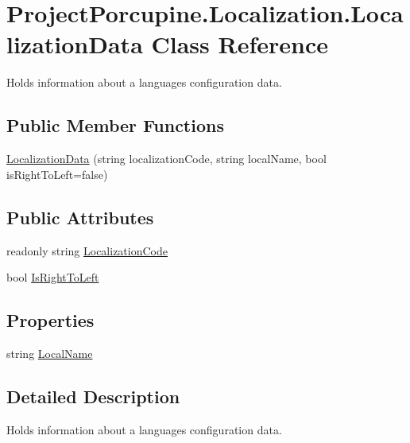 \hypertarget{class_project_porcupine_1_1_localization_1_1_localization_data}{}\section{Project\+Porcupine.\+Localization.\+Localization\+Data Class Reference}
\label{class_project_porcupine_1_1_localization_1_1_localization_data}


Holds information about a language\textquotesingle{}s configuration data.  


\subsection*{Public Member Functions}
\begin{DoxyCompactItemize}
\item 
\hyperlink{class_project_porcupine_1_1_localization_1_1_localization_data_a0d6da83799f72abeb38ae28a867cba72}{Localization\+Data} (string localization\+Code, string local\+Name, bool is\+Right\+To\+Left=false)
\end{DoxyCompactItemize}
\subsection*{Public Attributes}
\begin{DoxyCompactItemize}
\item 
readonly string \hyperlink{class_project_porcupine_1_1_localization_1_1_localization_data_a660200b3716ffe0da7a3c74a470c6cdb}{Localization\+Code}
\item 
bool \hyperlink{class_project_porcupine_1_1_localization_1_1_localization_data_a74ecf56c3c8dd8d5e9bf1350d596b0b4}{Is\+Right\+To\+Left}
\end{DoxyCompactItemize}
\subsection*{Properties}
\begin{DoxyCompactItemize}
\item 
string \hyperlink{class_project_porcupine_1_1_localization_1_1_localization_data_a059d3c6a82c1d5d6a28a71bccf1a5cc7}{Local\+Name}
\end{DoxyCompactItemize}


\subsection{Detailed Description}
Holds information about a language\textquotesingle{}s configuration data. 



